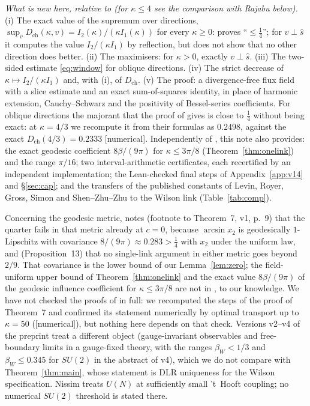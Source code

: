 \documentclass[11pt,a4paper]{article}
\theoremstyle{remark}
\theoremstyle{definition}
\theoremstyle{plain}
\theoremstyle{remark}
\newcommand{\st}[1]{\textsf{[#1]}}
\newcommand{\Dch}{D_{\mathrm{ch}}}
\begin{document}
\emph{What is new here, relative to \cite{BB26} (for $\kappa\le4$ see the comparison with Rajabu below).} (i) The exact value of the supremum over directions, $\sup_v\Dch(\kappa,v)=I_2(\kappa)/(\kappa I_1(\kappa))$ for every $\kappa\ge0$:
\cite{BB26} proves ``$\le\frac14$''; for $v\perp\hat s$ it computes the value $I_2/(\kappa I_1)$ by reflection, but does not show that no other direction does better.
(ii) The maximisers: for $\kappa>0$, exactly $v\perp\hat s$. (iii) The two-sided estimate \eqref{eq:window} for oblique directions.
(iv) The strict decrease of $\kappa\mapsto I_2/(\kappa I_1)$ and, with (i), of $\Dch$.
(v) The proof: a divergence-free flux field with a slice estimate and an exact sum-of-squares identity, in place of harmonic extension, Cauchy--Schwarz and the positivity of Bessel-series coefficients.
For oblique directions the majorant that the proof of \cite{BB26} gives is close to $\frac14$ without being exact: at $\kappa=4/3$ we recompute it from their formulas as $0.2498$, against the exact $\Dch(4/3)=0.2333$ \st{numerical}.
Independently of \cite{BB26}, this note also provides: the exact geodesic coefficient $8\beta/(9\pi)$ for $\kappa\le3\pi/8$ (Theorem~\ref{thm:onelink}) and the range $\pi/16$; two interval-arithmetic
certificates, each recertified by an independent implementation; the Lean-checked final steps of Appendix~\ref{app:v14} and \S\ref{sec:cap}; and the transfers of the published constants
of Levin, Royer, Gross, Simon and Shen--Zhu--Zhu to the Wilson link (Table~\ref{tab:comp}).

Concerning the geodesic metric, \cite{BB26} notes (footnote to Theorem~7, v1, p.~9) that the quarter fails in that metric already at $c=0$, because $\arcsin x_2$ is geodesically $1$-Lipschitz with covariance
$8/(9\pi)\approx0.283>\frac14$ with $x_2$ under the uniform law, and (Proposition~13) that no single-link argument in either metric goes beyond $2/9$. That covariance is the lower bound of our Lemma~\ref{lem:zero};
the field-uniform upper bound of Theorem~\ref{thm:onelink} and the exact value $8\beta/(9\pi)$ of the geodesic influence coefficient for $\kappa\le3\pi/8$ are not in \cite{BB26}, to our knowledge.
We have not checked the proofs of \cite{BB26} in full: we recomputed the steps of the proof of Theorem~7 and confirmed its statement numerically by optimal transport up to $\kappa=50$ (\st{numerical}), but nothing here depends on that check.
Versions v2--v4 of the preprint treat a different object (gauge-invariant observables and free-boundary limits in a gauge-fixed theory, with the ranges $\beta_W<1/3$ and $\beta_W\le0.345$ for $SU(2)$ in the abstract of v4),
which we do not compare with Theorem~\ref{thm:main}, whose statement is DLR uniqueness for the Wilson specification. Nissim \cite{Nis25} treats $U(N)$ at sufficiently small 't~Hooft coupling; no numerical $SU(2)$ threshold is stated there.
\end{document}
